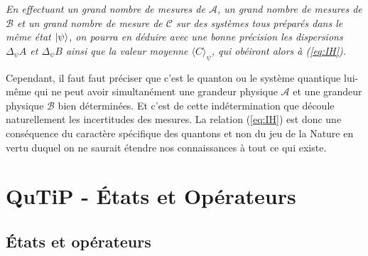 \medskip\colorbox[gray]{0.8}{
\parbox[c]{0.9\textwidth}{
\emph{En effectuant un grand nombre de mesures de $\mathcal{A}$, un grand nombre
de mesures de $\mathcal{B}$ et un grand nombre de mesure de $\mathcal{C}$ sur
des systèmes tous préparés dans le même état $\vert\psi\rangle$, on pourra en déduire
avec une bonne précision les dispersions $\Delta_{\psi}A$ et $\Delta_{\psi}B$
ainsi que la valeur moyenne $\langle C\rangle_{\psi}$, qui obéiront alors à
(\ref{eq:IH}).}
}}
\medskip

Cependant, il faut faut préciser que c'est le quanton ou le système quantique
lui-même qui ne peut avoir simultanément une grandeur physique $\mathcal{A}$
et une grandeur physique $\mathcal{B}$ bien déterminées. Et c'est de cette
indétermination que découle naturellement les incertitudes des mesures. La
relation (\ref{eq:IH}) est donc une conséquence du caractère spécifique des
quantons et non du jeu de la Nature en vertu duquel on ne saurait étendre nos
connaissances à tout ce qui existe.

\section{QuTiP - États et Opérateurs}

\subsection{États et opérateurs}


